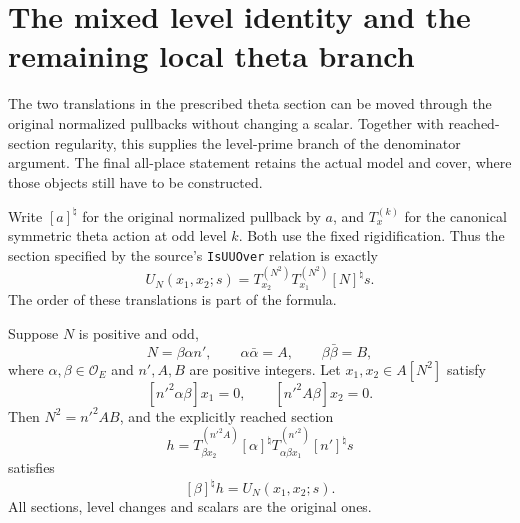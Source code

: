 \section{The mixed level identity and the remaining local theta branch}
\label{sec:geometry-mixed-level}

The two translations in the prescribed theta section can be moved
through the original normalized pullbacks without changing a scalar.
Together with reached-section regularity, this supplies the level-prime
branch of the denominator argument.  The final all-place statement
retains the actual model and cover, where those objects still have to
be constructed.

Write $[a]^\natural$ for the original normalized pullback by $a$, and
$T_x^{(k)}$ for the canonical symmetric theta action at odd level $k$.
Both use the fixed rigidification.  Thus the section specified by the
source's \texttt{IsUUOver} relation is exactly
\begin{equation}\label{eq:mixed-original-section}
 U_N(x_1,x_2;s)=T_{x_2}^{(N^2)}T_{x_1}^{(N^2)}[N]^\natural s.
\end{equation}
The order of these translations is part of the formula.

\begin{proposition}\label{prop:exact-mixed-pullback}
Suppose $N$ is positive and odd,
\[
 N=\beta\alpha n',\qquad
 \alpha\bar\alpha=A,\qquad\beta\bar\beta=B,
\]
where $\alpha,\beta\in\mathcal O_E$ and $n',A,B$ are positive
integers.  Let $x_1,x_2\in A[N^2]$ satisfy
\[
 [n'^2\alpha\beta]x_1=0,\qquad[n'^2A\beta]x_2=0.
\]
Then $N^2=n'^2AB$, and the explicitly reached section
\begin{equation}\label{eq:mixed-reached-explicit}
 h=T_{\beta x_2}^{(n'^2A)}[\alpha]^\natural
          T_{\alpha\beta x_1}^{(n'^2)}[n']^\natural s
\end{equation}
satisfies
\begin{equation}\label{eq:mixed-exact-factorization}
                 [\beta]^\natural h=U_N(x_1,x_2;s).
\end{equation}
All sections, level changes and scalars are the original ones.
\end{proposition}

